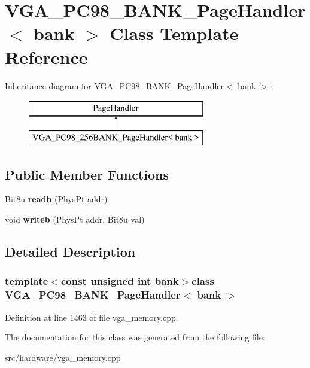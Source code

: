 \hypertarget{classVGA__PC98__256BANK__PageHandler}{\section{V\-G\-A\-\_\-\-P\-C98\-\_\-B\-A\-N\-K\-\_\-\-Page\-Handler$<$ bank $>$ Class Template Reference}
\label{classVGA__PC98__256BANK__PageHandler}
}
Inheritance diagram for V\-G\-A\-\_\-\-P\-C98\-\_\-B\-A\-N\-K\-\_\-\-Page\-Handler$<$ bank $>$\-:\begin{figure}[H]
\begin{center}
\leavevmode
\includegraphics[height=2.000000cm]{classVGA__PC98__256BANK__PageHandler}
\end{center}
\end{figure}
\subsection*{Public Member Functions}
\begin{DoxyCompactItemize}
\item 
\hypertarget{classVGA__PC98__256BANK__PageHandler_adbacfa3281ce5bb5c96cfeb433b58ff8}{Bit8u {\bfseries readb} (Phys\-Pt addr)}\label{classVGA__PC98__256BANK__PageHandler_adbacfa3281ce5bb5c96cfeb433b58ff8}

\item 
\hypertarget{classVGA__PC98__256BANK__PageHandler_ad86422e0c5069c8aa68c1c4ece4c5a13}{void {\bfseries writeb} (Phys\-Pt addr, Bit8u val)}\label{classVGA__PC98__256BANK__PageHandler_ad86422e0c5069c8aa68c1c4ece4c5a13}

\end{DoxyCompactItemize}


\subsection{Detailed Description}
\subsubsection*{template$<$const unsigned int bank$>$class V\-G\-A\-\_\-\-P\-C98\-\_\-B\-A\-N\-K\-\_\-\-Page\-Handler$<$ bank $>$}



Definition at line 1463 of file vga\-\_\-memory.\-cpp.



The documentation for this class was generated from the following file\-:\begin{DoxyCompactItemize}
\item 
src/hardware/vga\-\_\-memory.\-cpp\end{DoxyCompactItemize}
